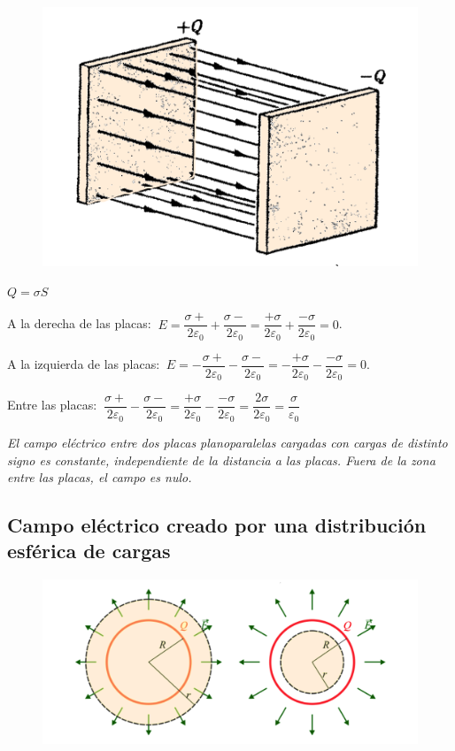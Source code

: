\begin{figure}[H]
	\centering
	\includegraphics[width=.8\textwidth]{imagenes/imagenes23/T23IM09.png}
\end{figure}

$Q=\sigma S$

A la derecha de las placas: $\ E=\dfrac{\sigma+}{2\varepsilon_0}+\dfrac{\sigma-}{2\varepsilon_0}=\dfrac{+\sigma}{2\varepsilon_0}+\dfrac{-\sigma}{2\varepsilon_0}=0$.

 A la izquierda de las placas: $\ E=-\dfrac{\sigma+}{2\varepsilon_0}-\dfrac{\sigma-}{2\varepsilon_0}=-\dfrac{+\sigma}{2\varepsilon_0}-\dfrac{-\sigma}{2\varepsilon_0}=0$.

Entre las placas: $\ \dfrac{\sigma+}{2\varepsilon_0}-\dfrac{\sigma-}{2\varepsilon_0}=\dfrac{+\sigma}{2\varepsilon_0}-\dfrac{-\sigma}{2\varepsilon_0}=\dfrac{2\sigma}{2\varepsilon_0}=\dfrac{\sigma}{\varepsilon_0}$

\emph{El campo eléctrico entre dos placas  planoparalelas cargadas con cargas de distinto signo es constante, independiente de la distancia a las placas. Fuera de la zona entre las placas, el campo es nulo.}

\subsection{Campo eléctrico creado por una distribución esférica de cargas}

\begin{figure}[H]
	\centering
	\includegraphics[width=1\textwidth]{imagenes/imagenes23/T23IM10.png}
\end{figure}

